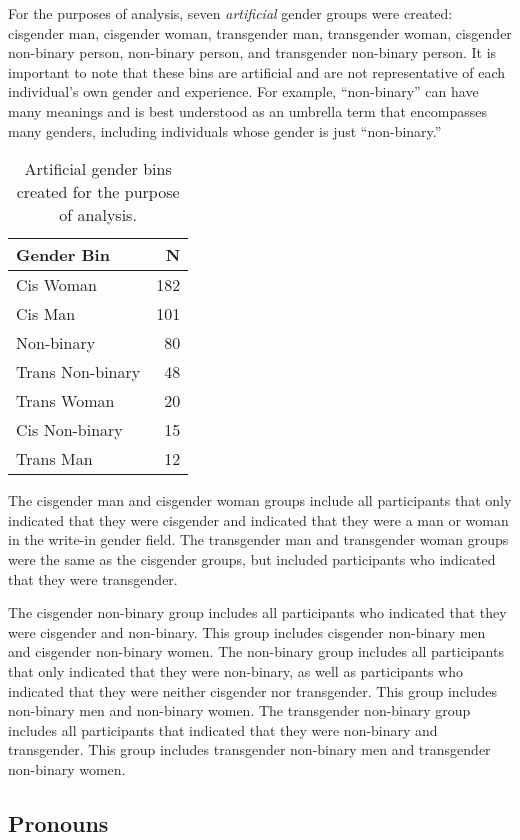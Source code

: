 \documentclass[12pt,twoside]{reedthesis}
\begin{document}
For the purposes of analysis, seven \emph{artificial} gender groups were created: cisgender man, cisgender woman, transgender man, transgender woman, cisgender non-binary person, non-binary person, and transgender non-binary person. It is important to note that these bins are artificial and are not representative of each individual's own gender and experience. For example, ``non-binary'' can have many meanings and is best understood as an umbrella term that encompasses many genders, including individuals whose gender is just ``non-binary.''
\begin{longtable}[t]{lr}
\caption{\label{tab:unnamed-chunk-3}Artificial gender bins created for the purpose of analysis.}\\
\toprule
Gender Bin & N\\
\midrule
Cis Woman & 182\\
Cis Man & 101\\
Non-binary & 80\\
Trans Non-binary & 48\\
Trans Woman & 20\\
\addlinespace
Cis Non-binary & 15\\
Trans Man & 12\\
\bottomrule
\end{longtable}
The cisgender man and cisgender woman groups include all participants that only indicated that they were cisgender and indicated that they were a man or woman in the write-in gender field. The transgender man and transgender woman groups were the same as the cisgender groups, but included participants who indicated that they were transgender.

The cisgender non-binary group includes all participants who indicated that they were cisgender and non-binary. This group includes cisgender non-binary men and cisgender non-binary women. The non-binary group includes all participants that only indicated that they were non-binary, as well as participants who indicated that they were neither cisgender nor transgender. This group includes non-binary men and non-binary women. The transgender non-binary group includes all participants that indicated that they were non-binary and transgender. This group includes transgender non-binary men and transgender non-binary women.

\hypertarget{pronouns}{%
\subsection{Pronouns}\label{pronouns}}
\end{document}
